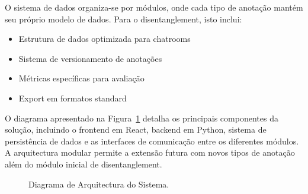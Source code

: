 O sistema de dados organiza-se por módulos, onde cada tipo de anotação mantém seu próprio modelo de dados. Para o disentanglement, isto inclui:

\begin{itemize}
    \item Estrutura de dados optimizada para chatrooms
    \item Sistema de versionamento de anotações
    \item Métricas específicas para avaliação
    \item Export em formatos standard
\end{itemize}

O diagrama apresentado na Figura~\ref{fig:diagrama-arquitectura} detalha os principais componentes da solução, incluindo o frontend em React, backend em Python, sistema de persistência de dados e as interfaces de comunicação entre os diferentes módulos. A arquitectura modular permite a extensão futura com novos tipos de anotação além do módulo inicial de disentanglement.

\begin{landscape}
    \begin{figure}[p]
        \centering
        \caption{Diagrama de Arquitectura do Sistema.}
        \label{fig:diagrama-arquitectura}
    \end{figure}
\end{landscape}